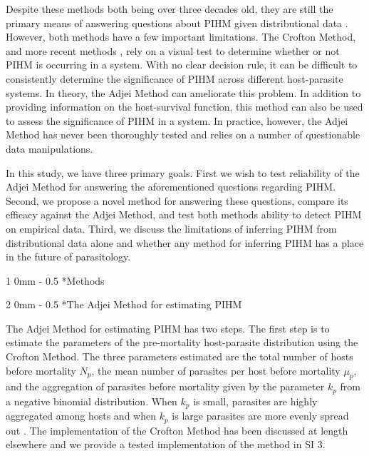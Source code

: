 \documentclass[12pt, a4paper]{article}
\makeatletter
\renewcommand{\section}{\@startsection
{section}%
{1}%
{0mm}%
{-\baselineskip}%
{0.5\baselineskip}%
{\normalfont\bf\large}} %
\renewcommand{\subsection}{\@startsection
{subsection}%
{2}%
{0mm}%
{-\baselineskip}%
{0.5\baselineskip}%
{\normalfont\bf}} %
\makeatother
\begin{document}
Despite these methods both being over three decades old, they are still the
primary means of answering questions about PIHM given distributional data
\citep[but see][for an alternative to the Crofton
Method]{Ferguson2011}. However, both methods have a few important limitations.
The Crofton Method, and more recent methods \citep{Ferguson2011},
rely on a visual test to determine whether or not PIHM is occurring in a
system.  With no clear decision rule, it can be difficult to consistently determine the
significance of PIHM across different host-parasite systems. In theory, the Adjei Method can ameliorate this problem. In addition to providing information on the host-survival function, this method can also be used to assess the significance of
PIHM in a system.
In practice, however, the Adjei Method has never been thoroughly tested and
relies on a number of questionable data manipulations.

In this study, we have
three primary goals. First we wish to test reliability of the Adjei Method for
answering the aforementioned questions regarding PIHM.  Second, we propose a
novel method for answering these questions, compare its efficacy against the Adjei Method, and test both methods ability to detect PIHM on empirical data.  Third, we
discuss the limitations of inferring PIHM from distributional data alone and
whether any method for inferring PIHM has a place in the future of
parasitology.

\section*{Methods}

\subsection*{The Adjei Method for estimating PIHM}

The Adjei Method for estimating PIHM has two steps.  The first
step is to estimate the parameters of the pre-mortality host-parasite
distribution using the Crofton Method.  The three parameters estimated are the
total number of hosts before mortality $N_p$,  the mean number of parasites per
host before mortality $\mu_p$, and the aggregation of parasites before
mortality given by the parameter $k_p$ from a negative binomial distribution.
When $k_p$ is small, parasites are highly aggregated among hosts and when
$k_p$ is large parasites are more evenly spread out \citep{Wilson2002}.  The implementation of the Crofton Method has been discussed at length elsewhere \citep[e.g.][]{Royce1990,Lester1984} and we provide a tested implementation of the method in SI 3.
\end{document}
